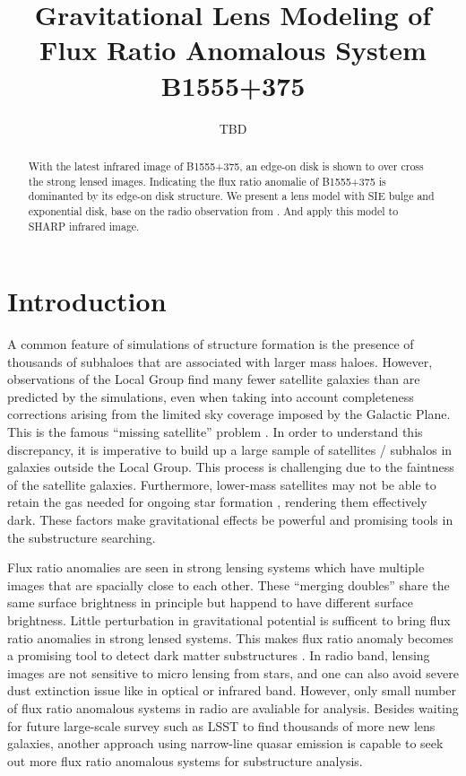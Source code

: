 \documentclass[manuscript]{emulateapj}
\begin{document}
\title{Gravitational Lens Modeling of Flux Ratio Anomalous System B1555+375}
\author{TBD}

\begin{abstract}
With the latest infrared image of B1555+375, an edge-on disk is shown to over cross the strong lensed images. Indicating the flux ratio anomalie of B1555+375 is dominanted by its edge-on disk structure. We present a lens model with SIE bulge and exponential disk, base on the radio observation from \citet{Marlow}. And apply this model to SHARP infrared image.

\end{abstract}


\section{Introduction}

A common feature of simulations of structure formation is the presence
of thousands of subhaloes that are associated with larger mass haloes.
However, observations of the Local Group find many fewer satellite
galaxies than are predicted by the simulations, even when taking into
account completeness corrections arising from the limited sky coverage
imposed by the Galactic Plane.  This is the famous ``missing
satellite'' problem \citep{Klypin1999, Moore1999, S07}.  In order to understand
this discrepancy, it is imperative to build up a large sample of satellites /
subhalos in galaxies outside the Local Group.  This process is challenging
due to the faintness of the satellite galaxies.  Furthermore, lower-mass
satellites may not be able to retain the gas needed for ongoing star
formation \citep[e.g.,][]{P11}, rendering them effectively dark.
These
factors make gravitational effects be powerful and promising tools in
the substructure searching.


	Flux ratio anomalies are seen in strong lensing systems which have multiple images that are spacially close to each other. These ``merging doubles'' share the same surface brightness in principle but happend to have different surface brightness. Little perturbation in gravitational potential is sufficent to bring flux ratio anomalies in strong lensed systems. This makes flux ratio anomaly becomes a promising tool to detect dark matter substructures \citep{Dalal2002, N13}. In radio band, lensing images are not sensitive to micro lensing from stars, and one can also avoid severe dust extinction issue like in optical or infrared band. However, only small number of flux ratio anomalous systems in radio are avaliable for analysis. Besides waiting for future large-scale survey such as LSST to find thousands of more new lens galaxies, another approach using narrow-line quasar emission \citep{N14} is capable to seek out more flux ratio anomalous systems for substructure analysis. 
	
\end{document}

